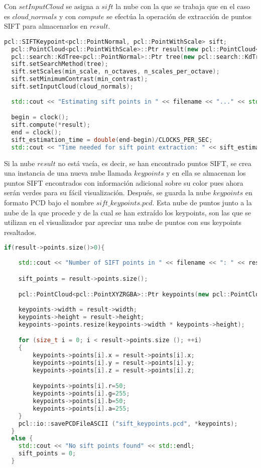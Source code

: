 Con $setInputCloud$ se asigna a $sift$ la nube con la que se trabaja que en el caso es $cloud\_normals$ y con $compute$ se efectúa la operación de extracción de puntos SIFT para almacenarlos en $result$.


\begin{lstlisting}[language=C++,breaklines]
  pcl::SIFTKeypoint<pcl::PointNormal, pcl::PointWithScale> sift;
  pcl::PointCloud<pcl::PointWithScale>::Ptr result(new pcl::PointCloud<pcl::PointWithScale>);
  pcl::search::KdTree<pcl::PointNormal>::Ptr tree(new pcl::search::KdTree<pcl::PointNormal> ());
  sift.setSearchMethod(tree);
  sift.setScales(min_scale, n_octaves, n_scales_per_octave);
  sift.setMinimumContrast(min_contrast);
  sift.setInputCloud(cloud_normals);
 
  std::cout << "Estimating sift points in " << filename << "..." << std::endl;

  begin = clock();
  sift.compute(*result);
  end = clock();
  sift_estimation_time = double(end-begin)/CLOCKS_PER_SEC;
  std::cout << "Time needed for sift point extraction: " << sift_estimation_time << " seconds" << std::endl << std::endl;
\end{lstlisting}

Si la nube $result$ no está vacía, es decir, se han encontrado puntos SIFT, se crea una instancia de una nueva nube llamada $keypoints$ y en ella se almacenan los puntos SIFT encontrados con información adicional sobre su color pues ahora serán verdes para su fácil visualización. Después, se guarda la nube $keypoints$ en formato PCD bajo el nombre $sift\_keypoints.pcd$. Esta nube de puntos junto a la nube de la que procede y de la cual se han extraído los keypoints, son las que se utilizan en el visualizador par apreciar una nube de puntos con sus keypoints resaltados.

\begin{lstlisting}[language=C++,breaklines]
  if(result->points.size()>0){
  
  	std::cout << "Number of SIFT points in " << filename << ": " << result->points.size () << std::endl;

	sift_points = result->points.size();

	pcl::PointCloud<pcl::PointXYZRGBA>::Ptr keypoints(new pcl::PointCloud<pcl::PointXYZRGBA>);
  
	keypoints->width = result->width;
	keypoints->height = result->height;
	keypoints->points.resize(keypoints->width * keypoints->height);

   	for (size_t i = 0; i < result->points.size (); ++i)
  	{
    	keypoints->points[i].x = result->points[i].x;
    	keypoints->points[i].y = result->points[i].y;
    	keypoints->points[i].z = result->points[i].z;

  		keypoints->points[i].r=50;
  		keypoints->points[i].g=255;
  		keypoints->points[i].b=50;
  		keypoints->points[i].a=255;
  	}
  	pcl::io::savePCDFileASCII ("sift_keypoints.pcd", *keypoints);
  }
  else {
  	std::cout << "No sift points found" << std::endl;
	sift_points = 0;
  }
\end{lstlisting}

